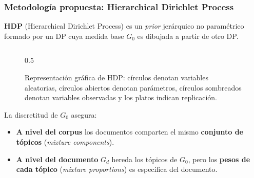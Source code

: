 \documentclass[
	spanish, %
	aspectratio=43, %
	hyperref={pdfencoding=auto,psdextra},
	xcolor={dvipsnames,table,usenames},
]{beamer}
\begin{document}
\begin{frame}[t]
\frametitle{Metodología propuesta: Hierarchical Dirichlet Process}
\textbf{HDP} (Hierarchical Dirichlet Process) es un \textit{prior} jerárquico no paramétrico formado por un DP cuya medida base $G_{0}$ es dibujada a partir de otro DP.

\vspace*{-0.1in}
\begin{figure}
\begin{columns}
  \begin{column}{0.5\textwith}
  \hspace*{-10em}
\caption{Representación gráfica de HDP: círculos denotan variables aleatorias, círculos abiertos denotan parámetros, círculos sombreados denotan variables observadas y los platos indican replicación.}
\end{column}
\end{columns}
\end{figure}

La discretitud de $G_{0}$ asegura:
  \begin{itemize}
    \item \textbf{A nivel del corpus} los documentos comparten el mismo \textbf{conjunto de tópicos} (\textit{mixture components}). 
    \item \textbf{A nivel del documento} $G_{d}$ hereda los tópicos de $G_{0}$, pero los \textbf{pesos de cada tópico} (\textit{mixture proportions}) es específica del documento.
  \end{itemize}
\end{frame}
\end{document}
